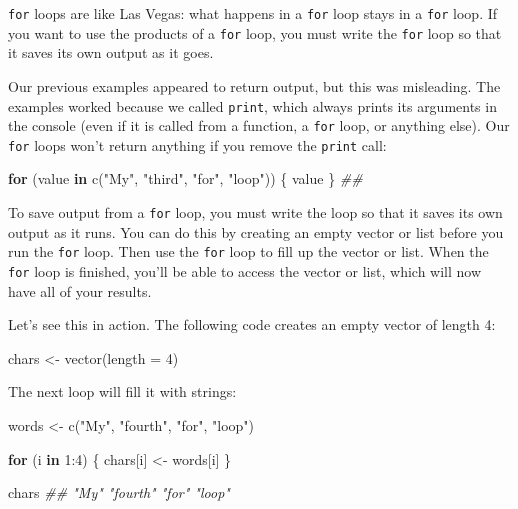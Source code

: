 \documentclass[
  letterpaper,
  DIV=11,
  numbers=noendperiod]{scrbook}
\newenvironment{Shaded}{\begin{snugshade}}{\end{snugshade}}
\newcommand{\AttributeTok}[1]{\textcolor[rgb]{0.40,0.45,0.13}{#1}}
\newcommand{\ControlFlowTok}[1]{\textcolor[rgb]{0.00,0.23,0.31}{\textbf{#1}}}
\newcommand{\DecValTok}[1]{\textcolor[rgb]{0.68,0.00,0.00}{#1}}
\newcommand{\DocumentationTok}[1]{\textcolor[rgb]{0.37,0.37,0.37}{\textit{#1}}}
\newcommand{\FunctionTok}[1]{\textcolor[rgb]{0.28,0.35,0.67}{#1}}
\newcommand{\NormalTok}[1]{\textcolor[rgb]{0.00,0.23,0.31}{#1}}
\newcommand{\OtherTok}[1]{\textcolor[rgb]{0.00,0.23,0.31}{#1}}
\newcommand{\SpecialCharTok}[1]{\textcolor[rgb]{0.37,0.37,0.37}{#1}}
\newcommand{\StringTok}[1]{\textcolor[rgb]{0.13,0.47,0.30}{#1}}
\begin{document}
\texttt{for} loops are like Las Vegas: what happens in a \texttt{for}
loop stays in a \texttt{for} loop. If you want to use the products of a
\texttt{for} loop, you must write the \texttt{for} loop so that it saves
its own output as it goes.

Our previous examples appeared to return output, but this was
misleading. The examples worked because we called \texttt{print}, which
always prints its arguments in the console (even if it is called from a
function, a \texttt{for} loop, or anything else). Our \texttt{for} loops
won't return anything if you remove the \texttt{print} call:

\begin{Shaded}
\begin{Highlighting}[]
\ControlFlowTok{for}\NormalTok{ (value }\ControlFlowTok{in} \FunctionTok{c}\NormalTok{(}\StringTok{"My"}\NormalTok{, }\StringTok{"third"}\NormalTok{, }\StringTok{"for"}\NormalTok{, }\StringTok{"loop"}\NormalTok{)) \{}
\NormalTok{  value}
\NormalTok{\}}
\DocumentationTok{\#\#}
\end{Highlighting}
\end{Shaded}

To save output from a \texttt{for} loop, you must write the loop so that
it saves its own output as it runs. You can do this by creating an empty
vector or list before you run the \texttt{for} loop. Then use the
\texttt{for} loop to fill up the vector or list. When the \texttt{for}
loop is finished, you'll be able to access the vector or list, which
will now have all of your results.

Let's see this in action. The following code creates an empty vector of
length 4:

\begin{Shaded}
\begin{Highlighting}[]
\NormalTok{chars }\OtherTok{\textless{}{-}} \FunctionTok{vector}\NormalTok{(}\AttributeTok{length =} \DecValTok{4}\NormalTok{)}
\end{Highlighting}
\end{Shaded}

The next loop will fill it with strings:

\begin{Shaded}
\begin{Highlighting}[]
\NormalTok{words }\OtherTok{\textless{}{-}} \FunctionTok{c}\NormalTok{(}\StringTok{"My"}\NormalTok{, }\StringTok{"fourth"}\NormalTok{, }\StringTok{"for"}\NormalTok{, }\StringTok{"loop"}\NormalTok{)}

\ControlFlowTok{for}\NormalTok{ (i }\ControlFlowTok{in} \DecValTok{1}\SpecialCharTok{:}\DecValTok{4}\NormalTok{) \{}
\NormalTok{  chars[i] }\OtherTok{\textless{}{-}}\NormalTok{ words[i]}
\NormalTok{\}}

\NormalTok{chars}
\DocumentationTok{\#\# "My"    "fourth" "for"   "loop"}
\end{Highlighting}
\end{Shaded}
\end{document}
